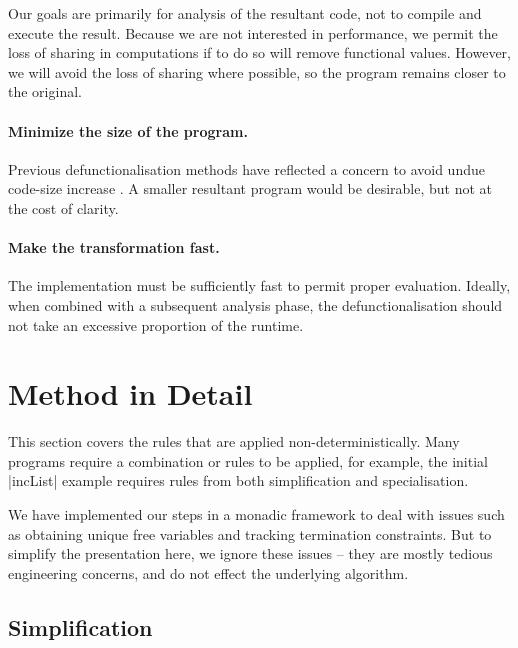 \documentclass[preprint]{sigplanconf}
\begin{document}
Our goals are primarily for analysis of the resultant code, not to compile and execute the result. Because we are not interested in performance, we permit the loss of sharing in computations if to do so will remove functional values. However, we will avoid the loss of sharing where possible, so the program remains closer to the original.

\paragraph{Minimize the size of the program.} Previous defunctionalisation methods have reflected a concern to avoid undue code-size increase \cite{chin:higher_order_removal}. A smaller resultant program would be desirable, but not at the cost of clarity.

\paragraph{Make the transformation fast.} The implementation must be sufficiently fast to permit proper evaluation. Ideally, when combined with a subsequent analysis phase, the defunctionalisation should not take an excessive proportion of the runtime.


\section{Method in Detail}
\label{sec:detailed}

\begin{comment}
\begin{code}
data Prog = Prog deriving Eq
simplify,arity,inline,specialise :: Prog -> Prog
\end{code}
\end{comment}

This section covers the rules that are applied non-deterministically. Many programs require a combination or rules to be applied, for example, the initial |incList| example requires rules from both simplification and specialisation.

We have implemented our steps in a monadic framework to deal with issues such as obtaining unique free variables and tracking termination constraints. But to simplify the presentation here, we ignore these issues -- they are mostly tedious engineering concerns, and do not effect the underlying algorithm.

\subsection{Simplification}
\label{sec:simplification_detail}
\end{document}
